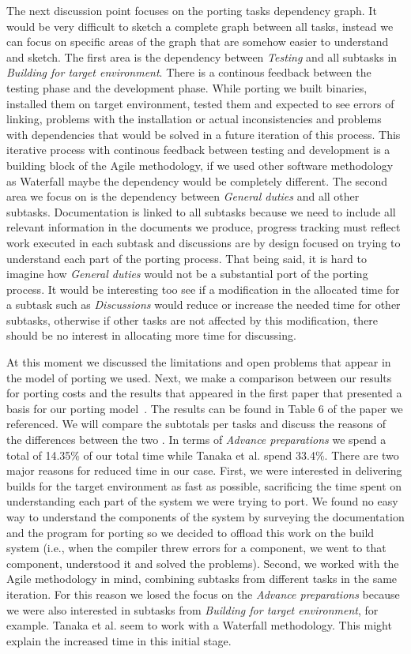 The next discussion point focuses on the porting tasks dependency graph. It
would be very difficult to sketch a complete graph between all tasks, instead we
can focus on specific areas of the graph that are somehow easier to understand
and sketch. The first area is the dependency between \textit{Testing} and all
subtasks in \textit{Building for target environment}. There is a continous
feedback between the testing phase and the development phase. While porting we
built binaries, installed them on target environment, tested them and expected
to see errors of linking, problems with the installation or actual
inconsistencies and problems with dependencies that would be solved in a future
iteration of this process. This iterative process with continous feedback
between testing and development is a building block of the Agile methodology, if
we used other software methodology as Waterfall maybe the dependency would be
completely different. The second area we focus on is the dependency between
\textit{General duties} and all other subtasks. Documentation is linked to all
subtasks because we need to include all relevant information in the documents we
produce, progress tracking must reflect work executed in each subtask and
discussions are by design focused on trying to understand each part of the
porting process. That being said, it is hard to imagine how \textit{General
duties} would not be a substantial port of the porting process. It would be
interesting too see if a modification in the allocated time for a subtask such
as \textit{Discussions} would reduce or increase the needed time for other
subtasks, otherwise if other tasks are not affected by this modification, there
should be no interest in allocating more time for discussing.

At this moment we discussed the limitations and open problems that appear in the
model of porting we used. Next, we make a comparison between our results for
porting costs and the results that appeared in the first paper that presented a
basis for our porting model~\cite{b1}. The results can be found in Table 6 of
the paper we referenced. We will compare the subtotals per tasks and discuss the
reasons of the differences between the two . In terms of \textit{Advance
preparations} we spend a total of 14.35\% of our total time while Tanaka et al.
spend 33.4\%. There are two major reasons for reduced time in our case. First,
we were interested in delivering builds for the target environment as fast as
possible, sacrificing the time spent on understanding each part of the system we
were trying to port. We found no easy way to understand the components of the
system by surveying the documentation and the program for porting so we decided
to offload this work on the build system (i.e., when the compiler threw errors
for a component, we went to that component, understood it and solved the
problems). Second, we worked with the Agile methodology in mind, combining
subtasks from different tasks in the same iteration. For this reason we
losed the focus on the \textit{Advance preparations} because we were also
interested in subtasks from \textit{Building for target environment}, for
example. Tanaka et al. seem to work with a Waterfall methodology. This might
explain the increased time in this initial stage.

